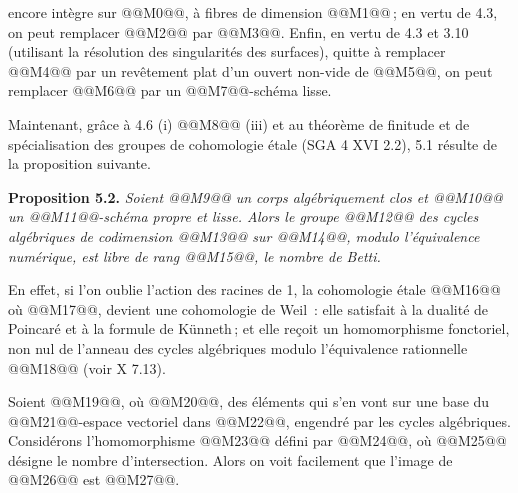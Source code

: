 
encore int\`egre sur @@M0@@, \`a fibres de dimension @@M1@@\,; en vertu de 4.3, on peut remplacer @@M2@@ par @@M3@@. Enfin, en vertu de 4.3 et 3.10 (utilisant la r\'esolution des singularit\'es des surfaces), quitte \`a remplacer @@M4@@ par un rev\^etement plat d'un ouvert non-vide de @@M5@@, on peut remplacer @@M6@@ par un @@M7@@-sch\'ema lisse.

Maintenant, gr\^ace \`a 4.6 (i) @@M8@@ (iii) et au th\'eor\`eme de finitude et de sp\'ecialisation des groupes de cohomologie \'etale (SGA 4 XVI 2.2), 5.1 r\'esulte de la proposition suivante.

\textbf{Proposition 5.2.} \emph{Soient @@M9@@ un corps alg\'ebriquement clos et @@M10@@ un @@M11@@-sch\'ema propre et lisse. Alors le groupe @@M12@@ des cycles alg\'ebriques de codimension @@M13@@ sur @@M14@@, modulo l'\'equivalence num\'erique, est libre de rang @@M15@@, le nombre de Betti.}

En effet, si l'on oublie l'action des racines de 1, la cohomologie \'etale @@M16@@ o\`u @@M17@@, devient une cohomologie de Weil~: elle satisfait \`a la dualit\'e de Poincar\'e et \`a la formule de K\"unneth\,; et elle re\c{c}oit un homomorphisme fonctoriel, non nul de l'anneau des cycles alg\'ebriques modulo l'\'equivalence rationnelle @@M18@@ (voir X 7.13).

Soient @@M19@@, o\`u @@M20@@, des \'el\'ements qui s'en vont sur une base du @@M21@@-espace vectoriel dans @@M22@@, engendr\'e par les cycles alg\'ebriques. Consid\'erons l'homomorphisme
@@M23@@
d\'efini par @@M24@@, o\`u @@M25@@ d\'esigne le nombre d'intersection. Alors on voit facilement que l'image de @@M26@@ est @@M27@@.

